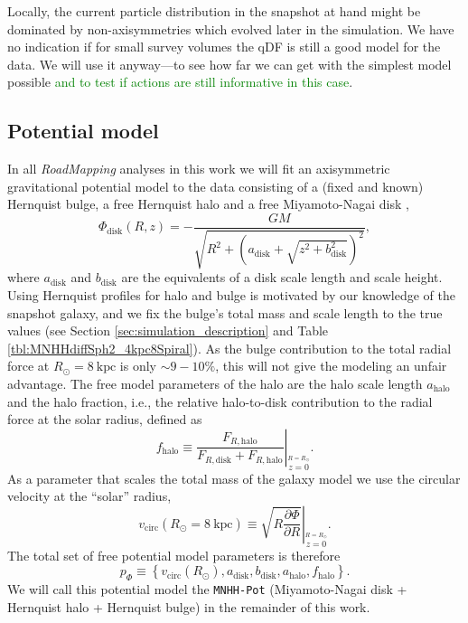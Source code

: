 \documentclass[iop,revtex4,numberedappendix,appendixfloats]{emulateapj}
\newcommand{\RM}{{\sl RoadMapping}}
\newcommand{\NEW}[1]{\textcolor{Green}{#1}}
\begin{document}
Locally, the current particle distribution in the snapshot at hand might be dominated by non-axisymmetries which evolved later in the simulation. We have no indication if for small survey volumes the qDF is still a good model for the data. We will use it anyway---to see how far we can get with the simplest model possible \NEW{and to test if actions are still informative in this case}.

\subsection{Potential model} \label{sec:potential_model}

In all \RM{} analyses in this work we will fit an axisymmetric gravitational potential model to the data consisting of a (fixed and known) Hernquist bulge, a free Hernquist halo and a free Miyamoto-Nagai disk \citep{1975PASJ...27..533M},
\begin{equation}
\Phi_\text{disk}(R,z) = - \frac{GM}{\sqrt{R^2+(a_\text{disk}+\sqrt{z^2+b_\text{disk}^2})^2}}, \label{eq:MN-disk}
\end{equation}
where $a_\text{disk}$ and $b_\text{disk}$ are the equivalents of a disk scale length and scale height. Using Hernquist profiles for halo and bulge is motivated by our knowledge of the snapshot galaxy, and we fix the bulge's total mass and scale length to the true values (see Section \ref{sec:simulation_description} and Table \ref{tbl:MNHHdiffSph2_4kpc8Spiral}). As the bulge contribution to the total radial force at $R_\odot=8~\text{kpc}$ is only $\sim9-10\%$, this will not give the modeling an unfair advantage. The free model parameters of the halo are the halo scale length $a_\text{halo}$ and the halo fraction, i.e., the relative halo-to-disk contribution to the radial force at the solar radius, defined as
\begin{equation}
f_\text{halo} \equiv \left. \frac{F_{R,\text{halo}}}{F_{R,\text{disk}} + F_{R,\text{halo}}} \right|_{\stackrel{R=R_\odot}{z=0}}.\label{eq:fhalo}
\end{equation}
As a parameter that scales the total mass of the galaxy model we use the circular velocity at the ``solar'' radius,
\begin{equation}
v_\text{circ}(R_\odot=8~\text{kpc}) \equiv \left. \sqrt{ R \frac{\partial \Phi}{\partial R} }\right|_{\stackrel{R=R_\odot}{z=0}} . \label{eq:circvel}
\end{equation}  
The total set of free potential model parameters is therefore
\begin{equation}
p_\Phi \equiv \left\{ v_\text{circ}(R_\odot),a_\text{disk},b_\text{disk},a_\text{halo},f_\text{halo}\right\}.
\end{equation} 
We will call this potential model the \texttt{MNHH-Pot} (Miyamoto-Nagai disk + Hernquist halo + Hernquist bulge) in the remainder of this work.
\end{document}
